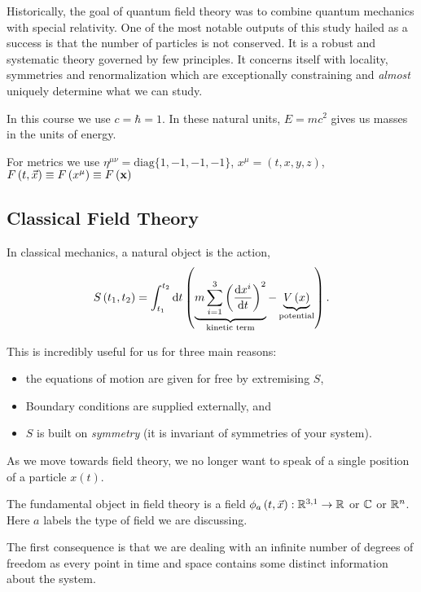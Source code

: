 
Historically, the goal of quantum field theory was to combine quantum mechanics with special relativity. One of the most notable outputs of this study hailed as a success is that the number of particles is not conserved. It is a robust and systematic theory governed by few principles. It concerns itself with locality, symmetries and renormalization which are exceptionally constraining and \textit{almost} uniquely determine what we can study. 

In this course we use $c = \hbar = 1$. In these natural units, $E = mc^2$ gives us masses in the units of energy.

For metrics we use $\eta^{\mu \nu} = \text{diag}\{1,-1,-1,-1\} $, $x^{\mu} = \left( t,x,y,z \right) $, $F \left( t,\vec{x} \right) \equiv F\left( x^{\mu} \right) \equiv F \left( \vb{x} \right) $

\subsection{Classical Field Theory}


In classical mechanics, a natural object is the action,
\begin{align}
    S\left( t_1,t_2 \right) = \int_{t_1}^{t_2} \dd{t} \left( \underbrace{m \sum_{i=1}^{3} \left( \dv{x^{i}}{t} \right)^2}_{\text{kinetic term}} - \underbrace{V\left( x \right)}_{\text{potential}}    \right) 
.\end{align}

This is incredibly useful for us for three main reasons:
\begin{itemize}
    \item the equations of motion are given for free by extremising $S$,
    \item Boundary conditions are supplied externally, and
    \item $S$ is built on \textit{symmetry} (it is invariant of symmetries of your system).
\end{itemize} 

As we move towards field theory, we no longer want to speak of a single position of a particle $x\left( t \right) $.

The fundamental object in field theory is a field $\phi_a \left( t, \vec{x} \right) : \mathbb{R}^{3,1} \to \mathbb{R}$ or $\mathbb{C}$ or $\mathbb{R}^{n}$. Here $a$ labels the type of field we are discussing.


The first consequence is that we are dealing with an infinite number of degrees of freedom as every point in time and space contains some distinct information about the system.

